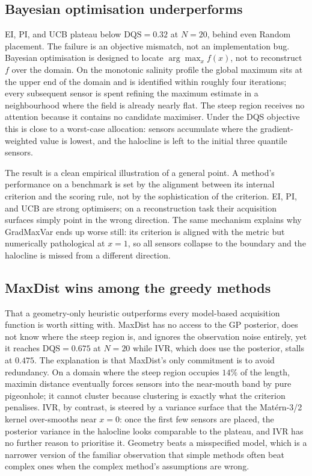 \documentclass[11pt,letterpaper]{article}
\begin{document}
\subsection{Bayesian optimisation underperforms}
EI, PI, and UCB plateau below $\mathrm{DQS}=0.32$ at $N=20$,
behind even Random placement. The failure is an objective
mismatch, not an implementation bug. Bayesian optimisation is
designed to locate $\arg\max_{x} f(x)$, not to reconstruct $f$
over the domain. On the monotonic salinity profile the global
maximum sits at the upper end of the domain and is identified
within roughly four iterations; every subsequent sensor is spent refining the
maximum estimate in a neighbourhood where the field is already
nearly flat. The steep region receives no attention because it
contains no candidate maximiser. Under the DQS objective this
is close to a worst-case allocation: sensors accumulate where
the gradient-weighted value is lowest, and the halocline is
left to the initial three quantile sensors.

The result is a clean empirical illustration of a general
point. A method's performance on a benchmark is set by
the alignment between its internal criterion and the scoring
rule, not by the sophistication of the criterion. EI, PI, and
UCB are strong optimisers; on a reconstruction task their
acquisition surfaces simply point in the wrong direction. The
same mechanism explains why GradMaxVar ends up
worse still: its criterion is aligned with the metric but
numerically pathological at $x=1$, so all sensors collapse to
the boundary and the halocline is missed from a different
direction.

\subsection{MaxDist wins among the greedy methods}
That a geometry-only heuristic outperforms every model-based
acquisition function is worth sitting with. MaxDist has no access to
the GP posterior, does not know where the steep region is, and
ignores the observation noise entirely, yet it reaches
$\mathrm{DQS}=0.675$ at $N=20$ while IVR, which does use the
posterior, stalls at $0.475$. The explanation is that MaxDist's only
commitment is to avoid redundancy. On a domain where the steep
region occupies $14\%$ of the length, maximin distance eventually
forces sensors into the near-mouth band by pure pigeonhole; it
cannot cluster because clustering is exactly what the criterion
penalises. IVR, by contrast, is steered by a variance surface that
the Mat\'ern-3/2 kernel over-smooths near $x=0$: once the first few
sensors are placed, the posterior variance in the halocline looks
comparable to the plateau, and IVR has no further reason to
prioritise it. Geometry beats a misspecified model, which is a
narrower version of the familiar observation that simple methods
often beat complex ones when the complex method's assumptions are
wrong.
\end{document}
